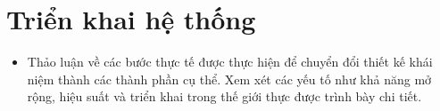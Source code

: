 \section{Triển khai hệ thống}
\begin{itemize}
\item Thảo luận về các bước thực tế được thực hiện để chuyển đổi thiết kế khái niệm thành các thành phần cụ thể. Xem xét các yếu tố như khả năng mở rộng, hiệu suất và triển khai trong thế giới thực được trình bày chi tiết.
\end{itemize}